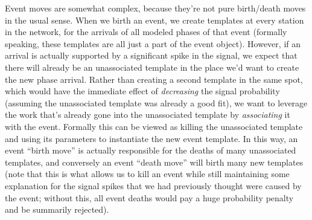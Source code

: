 \documentclass{article}
\begin{document}
Event moves are somewhat complex, because they're not pure birth/death moves in the usual sense. When we birth an event, we create templates at every station in the network, for the arrivals of all modeled phases of that event (formally speaking, these templates are all just a part of the event object). However, if an arrival is actually supported by a significant spike in the signal, we expect that there will already be an unassociated template in the place we'd want to create the new phase arrival. Rather than creating a second template in the same spot, which would have the immediate effect of {\em decreasing} the signal probability (assuming the unassociated template was already a good fit), we want to leverage the work that's already gone into the unassociated template by {\em associating} it with the event. Formally this can be viewed as killing the unassociated template and using its parameters to instantiate the new event template. In this way, an event ``birth move'' is actually responsible for the deaths of many unassociated templates, and conversely an event ``death move'' will birth many new templates (note that this is what allows us to kill an event while still maintaining some explanation for the signal spikes that we had previously thought were caused by the event; without this, all event deaths would pay a huge probability penalty and be summarily rejected). 
\end{document}
